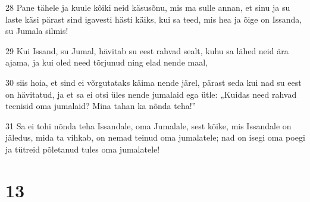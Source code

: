 \par 28 Pane tähele ja kuule kõiki neid käsusõnu, mis ma sulle annan, et sinu ja su laste käsi pärast sind igavesti hästi käiks, kui sa teed, mis hea ja õige on Issanda, su Jumala silmis!
\par 29 Kui Issand, su Jumal, hävitab su eest rahvad sealt, kuhu sa lähed neid ära ajama, ja kui oled need tõrjunud ning elad nende maal,
\par 30 siis hoia, et sind ei võrgutataks käima nende järel, pärast seda kui nad su eest on hävitatud, ja et sa ei otsi üles nende jumalaid ega ütle: „Kuidas need rahvad teenisid oma jumalaid? Mina tahan ka nõnda teha!”
\par 31 Sa ei tohi nõnda teha Issandale, oma Jumalale, sest kõike, mis Issandale on jäledus, mida ta vihkab, on nemad teinud oma jumalatele; nad on isegi oma poegi ja tütreid põletanud tules oma jumalatele!

\chapter{13}


